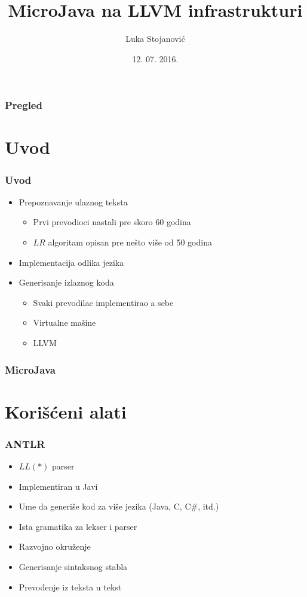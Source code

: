 \documentclass{beamer}
\title{MicroJava na LLVM infrastrukturi}
\author{Luka Stojanović}
\institute{
Elektrotehnički fakultet, \\ Beogradski univerzitet
}
\date{12. 07. 2016.}
\newcommand{\LL}[1]{$LL(#1)$ {}}
\newcommand{\LLa}{\LL{\ast}}
\begin{document}
\begin{frame}
	\titlepage
\end{frame}
  
\begin{frame}
	\frametitle{Pregled}
    \tableofcontents
\end{frame}

\section{Uvod}

\begin{frame}
	\frametitle{Uvod}
	\begin{itemize}
		\item Prepoznavanje ulaznog teksta
	    \begin{itemize}
			\item Prvi prevodioci nastali pre skoro 60 godina
			\item $LR$ algoritam opisan pre nešto više od 50 godina
		\end{itemize}
		\item Implementacija odlika jezika
		\item Generisanje izlaznog koda
	    \begin{itemize}
			\item Svaki prevodilac implementirao a sebe
			\item Virtualne mašine
			\item LLVM
		\end{itemize}
	\end{itemize}
\end{frame}


\begin{frame}
	\frametitle{MicroJava}
\end{frame}


\section{Korišćeni alati}
\begin{frame}
	\frametitle{ANTLR}
	\begin{itemize}
		\item \LLa parser
		\item Implementiran u Javi
		\item Ume da generiše kod za više jezika (Java, C, C\#, itd.)
		\item Ista gramatika za lekser i parser
		\item Razvojno okruženje
		\item Generisanje sintaksnog stabla
		\item Prevođenje iz teksta u tekst
	\end{itemize}
\end{frame}
\end{document}

